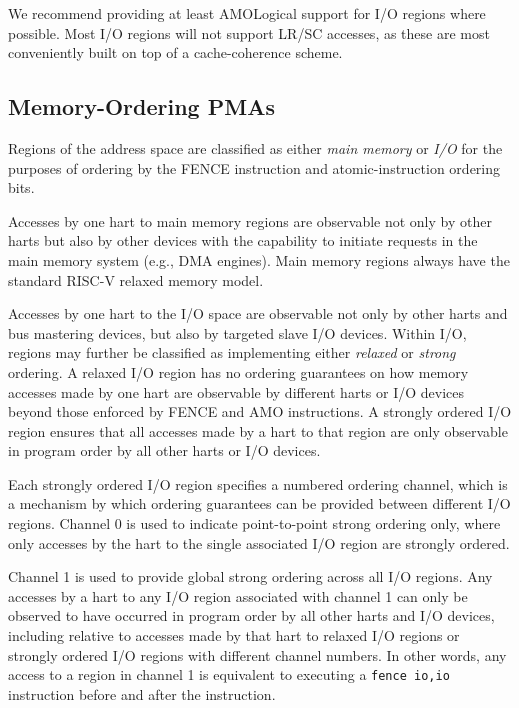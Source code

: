 \begin{commentary}
We recommend providing at least AMOLogical support for I/O regions
where possible.  Most I/O regions will not support LR/SC accesses, as
these are most conveniently built on top of a cache-coherence scheme.
\end{commentary}

\subsection{Memory-Ordering PMAs}

Regions of the address space are classified as either {\em main
  memory} or {\em I/O} for the purposes of ordering by the FENCE
instruction and atomic-instruction ordering bits.

Accesses by one hart to main memory regions are observable not only by
other harts but also by other devices with the capability to initiate
requests in the main memory system (e.g., DMA engines).  Main memory
regions always have the standard RISC-V relaxed memory model.

Accesses by one hart to the I/O space are observable not only by other
harts and bus mastering devices, but also by targeted slave I/O
devices.  Within I/O, regions may further be classified as
implementing either {\em relaxed} or {\em strong} ordering.  A relaxed
I/O region has no ordering guarantees on how memory accesses made by
one hart are observable by different harts or I/O devices beyond those
enforced by FENCE and AMO instructions.  A strongly ordered I/O region
ensures that all accesses made by a hart to that region are only
observable in program order by all other harts or I/O devices.

Each strongly ordered I/O region specifies a numbered ordering
channel, which is a mechanism by which ordering guarantees can be
provided between different I/O regions.  Channel 0 is used to indicate
point-to-point strong ordering only, where only accesses by the hart to the
single associated I/O region are strongly ordered.

Channel 1 is used to provide global strong ordering across all I/O
regions.  Any accesses by a hart to any I/O region associated with
channel 1 can only be observed to have occurred in program order by all
other harts and I/O devices, including relative to accesses made by
that hart to relaxed I/O regions or strongly ordered I/O regions with
different channel numbers.  In other words, any access to a region in
channel 1 is equivalent to executing a {\tt fence io,io}
instruction before and after the instruction.

